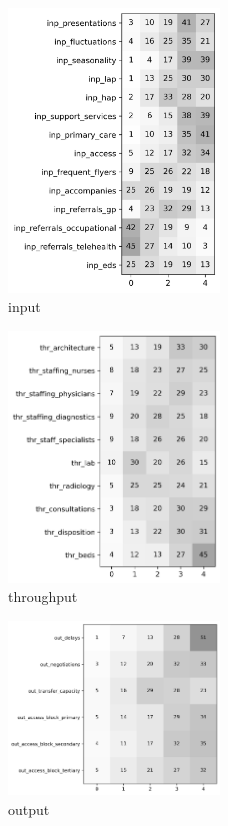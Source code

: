 \documentclass{article}
\begin{document}
\begin{figure}[H]
    \centering
        \includegraphics[width=0.5\textwidth]{../output/plots/input}
        \caption{input}
        \label{fig:input}
\end{figure}

\begin{figure}[H]
    \centering
        \includegraphics[width=0.5\textwidth]{../output/plots/throughput}
        \caption{throughput}
        \label{fig:throughput}
\end{figure}

\begin{figure}[H]
    \centering
        \includegraphics[width=0.5\textwidth]{../output/plots/output}
        \caption{output}
        \label{fig:output}
\end{figure}
\end{document}

